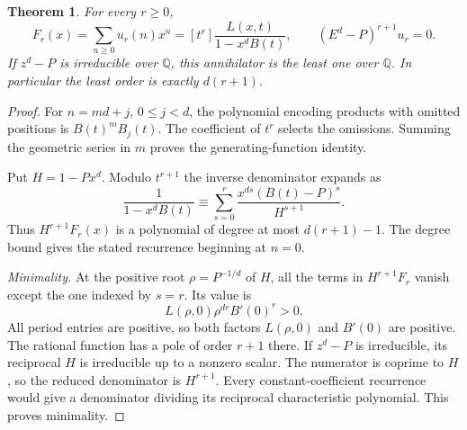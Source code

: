 \documentclass[11pt,letterpaper]{article}
\newtheorem{theorem}{Theorem}
\begin{document}
\begin{theorem}\label{th:main}
For every $r\ge0$,
\[
 F_r(x)=\sum_{n\ge0}u_r(n)x^n
       =[t^r]\frac{L(x,t)}{1-x^dB(t)},\qquad
       (E^d-P)^{r+1}u_r=0 .
\]
If $z^d-P$ is irreducible over $\mathbb Q$, this annihilator is the least one over $\mathbb Q$. In particular the least order is exactly $d(r+1)$.
\end{theorem}
\begin{proof}
For $n=md+j$, $0\le j<d$, the polynomial encoding products with omitted positions is $B(t)^m B_j(t)$. The coefficient of $t^r$ selects the omissions. Summing the geometric series in $m$ proves the generating-function identity.

Put $H=1-Px^d$. Modulo $t^{r+1}$ the inverse denominator expands as
\[
   \frac{1}{1-x^dB(t)}
      \equiv\sum_{s=0}^r\frac{x^{ds}(B(t)-P)^s}{H^{s+1}} .
\]
Thus $H^{r+1}F_r(x)$ is a polynomial of degree at most $d(r+1)-1$. The degree bound gives the stated recurrence beginning at $n=0$.

\newpage
\noindent\emph{Minimality.}
At the positive root $\rho=P^{-1/d}$ of $H$, all the terms in $H^{r+1}F_r$ vanish except the one indexed by $s=r$. Its value is
\[
     L(\rho,0)\rho^{dr}B'(0)^r>0.
\]
All period entries are positive, so both factors $L(\rho,0)$ and $B'(0)$ are positive. The rational function has a pole of order $r+1$ there. If $z^d-P$ is irreducible, its reciprocal $H$ is irreducible up to a nonzero scalar. The numerator is coprime to $H$, so the reduced denominator is $H^{r+1}$. Every constant-coefficient recurrence would give a denominator dividing its reciprocal characteristic polynomial. This proves minimality.
\end{proof}
\end{document}
